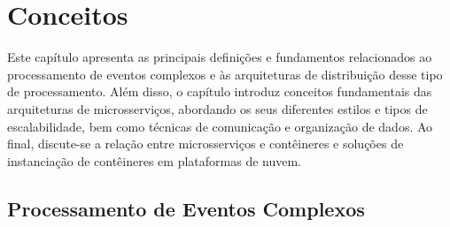 \chapter{Conceitos}
\label{cap:conceitos}

%







Este capítulo apresenta as principais definições e fundamentos relacionados ao processamento de eventos complexos e às arquiteturas de distribuição desse tipo de processamento. Além disso, o capítulo introduz conceitos fundamentais das arquiteturas de microsserviços, 
abordando os seus diferentes estilos e tipos de escalabilidade, bem como técnicas de comunicação e organização de dados. Ao final, discute-se a relação entre microsserviços e contêineres e soluções de instanciação de contêineres em plataformas de nuvem.%

\section{Processamento de Eventos Complexos}
\label{sec:cep}


